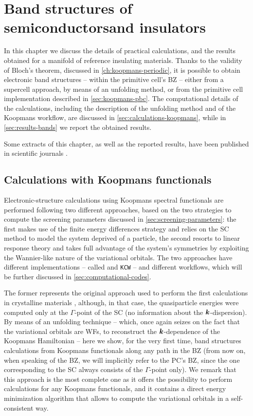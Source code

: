 \cleardoublepage
\chapter[Band structures of semiconductors and insulators]{Band structures of semiconductors\break and insulators\label{ch:band-structures}}
In this chapter we discuss the details of practical calculations, and the results obtained for a manifold of reference insulating materials. Thanks to the validity of Bloch's theorem, discussed in \cref{ch:koopmans-periodic}, it is possible to obtain electronic band structures -- within the primitive cell's BZ -- either from a supercell approach, by means of an unfolding method, or from the primitive cell implementation described in \cref{sec:koopmans-pbc}. The computational details of the calculations, including the description of the unfolding method and of the Koopmans workflow, are discussed in \cref{sec:calculations-koopmans}, while in \cref{sec:results-bands} we report the obtained results.

Some extracts of this chapter, as well as the reported results, have been published in scientific journals \cite{de_gennaro_blochs_2022,colonna_koopmans_2022}.

\clearpage
\section{Calculations with Koopmans functionals\label{sec:calculations-koopmans}}
Electronic-structure calculations using Koopmans spectral functionals are performed following two different approaches, based on the two strategies to compute the screening parameters discussed in \cref{sec:screening-parameters}: the first makes use of the finite energy differences strategy and relies on the SC method to model the system deprived of a particle, the second resorts to linear response theory and takes full advantage of the system's symmetries by exploiting the Wannier-like nature of the variational orbitals. The two approaches have different implementations -- called \kcp and \texttt{KCW} -- and different workflows, which will be further discussed in \cref{sec:computational-codes}.

The former represents the original approach used to perform the first calculations in crystalline materials \cite{nguyen_koopmans-compliant_2018}, although, in that case, the quasiparticle energies were computed only at the $\Gamma$-point of the SC (no information about the ${\bm k}$-dispersion). By means of an unfolding technique -- which, once again seizes on the fact that the variational orbitals are WFs, to reconstruct the ${\bm k}$-dependence of the Koopmans Hamiltonian -- here we show, for the very first time, band structures calculations from Koopmans functionals along any path in the BZ \cite{de_gennaro_blochs_2022} (from now on, when speaking of the BZ, we will implicitly refer to the PC's BZ, since the one corresponding to the SC always consists of the $\Gamma$-point only). We remark that this approach is the most complete one as it offers the possibility to perform calculations for any Koopmans functionals, and it contains a direct energy minimization algorithm that allows to compute the variational orbitals in a self-consistent way.

